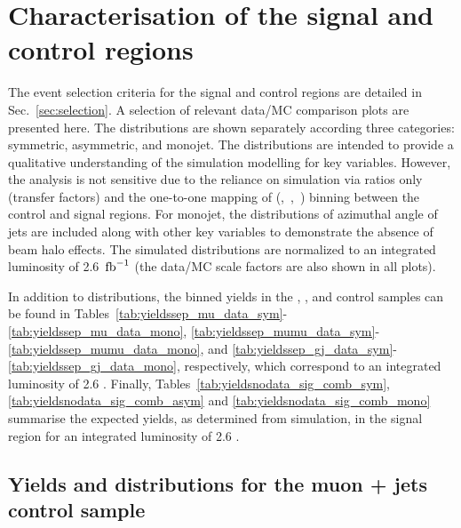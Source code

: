 \section{Characterisation of the signal and control regions}
\label{sec:yields}

The event selection criteria for the signal and control regions are
detailed in Sec.~\ref{sec:selection}. A selection of relevant data/MC
comparison plots are presented here. The distributions are shown
separately according three \njet categories: symmetric, asymmetric,
and monojet. The distributions are intended to provide a qualitative
understanding of the simulation modelling for key variables. However, 
the analysis is not sensitive due to the reliance on simulation via
ratios only (\ie transfer factors) and the one-to-one mapping of
(\njet,~\nb,~\scalht) binning between the control and signal
regions. For monojet, the distributions of azimuthal angle of jets are 
included along with other key variables to demonstrate the absence of 
beam halo effects. The simulated distributions are normalized to an integrated
luminosity of 2.6~$\text{fb}^{-1}$ (the data/MC scale factors are also shown
in all plots).

In addition to distributions, the binned yields in the \mj, \mmj, and
\gj control samples can be found in
Tables~\ref{tab:yieldssep_mu_data_sym}-\ref{tab:yieldssep_mu_data_mono},
\ref{tab:yieldssep_mumu_data_sym}-\ref{tab:yieldssep_mumu_data_mono},
and \ref{tab:yieldssep_gj_data_sym}-\ref{tab:yieldssep_gj_data_mono},
respectively, which correspond to an integrated luminosity of 2.6
\ifb. 
Finally, Tables~\ref{tab:yieldsnodata_sig_comb_sym},
\ref{tab:yieldsnodata_sig_comb_asym} and \ref{tab:yieldsnodata_sig_comb_mono} summarise the expected yields, as
determined from simulation, in the signal region for an integrated
luminosity of 2.6 \ifb.

\clearpage
\subsection{Yields and distributions for the muon + jets control sample}





